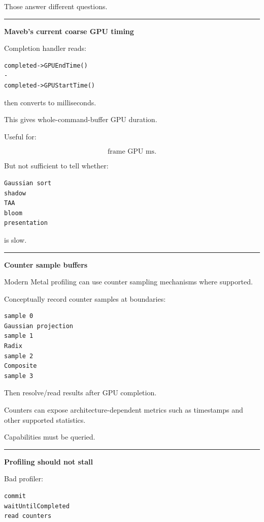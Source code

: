 Those answer different questions.

\begin{center}\rule{0.5\linewidth}{0.5pt}\end{center}

\textbf{Maveb's current coarse GPU timing}

Completion handler reads:

\begin{verbatim}
completed->GPUEndTime()
-
completed->GPUStartTime()
\end{verbatim}

then converts to milliseconds.

This gives whole-command-buffer GPU duration.

Useful for:

\[
\text{frame GPU ms}.
\]

But not sufficient to tell whether:

\begin{verbatim}
Gaussian sort
shadow
TAA
bloom
presentation
\end{verbatim}

is slow.

\begin{center}\rule{0.5\linewidth}{0.5pt}\end{center}

\textbf{Counter sample buffers}

Modern Metal profiling can use counter sampling mechanisms where supported.

Conceptually record counter samples at boundaries:

\begin{verbatim}
sample 0
Gaussian projection
sample 1
Radix
sample 2
Composite
sample 3
\end{verbatim}

Then resolve/read results after GPU completion.

Counters can expose architecture-dependent metrics such as timestamps and other supported statistics.

Capabilities must be queried.

\begin{center}\rule{0.5\linewidth}{0.5pt}\end{center}

\textbf{Profiling should not stall}

Bad profiler:

\begin{verbatim}
commit
waitUntilCompleted
read counters
\end{verbatim}

